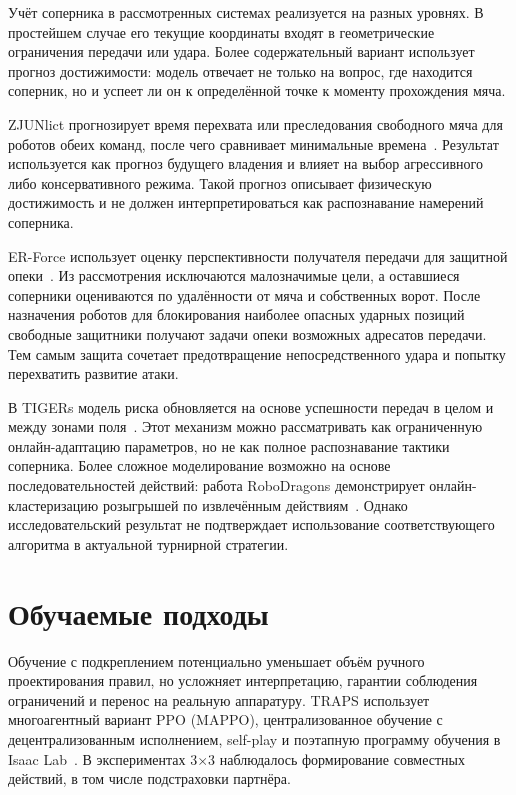 \documentclass{misisarticle}
\begin{document}
Учёт соперника в рассмотренных системах реализуется на разных уровнях. В простейшем случае его текущие координаты входят в геометрические ограничения передачи или удара. Более содержательный вариант использует прогноз достижимости: модель отвечает не только на вопрос, где находится соперник, но и успеет ли он к определённой точке к моменту прохождения мяча.

ZJUNlict прогнозирует время перехвата или преследования свободного мяча для роботов обеих команд, после чего сравнивает минимальные времена~\cite{zjunlict2025}. Результат используется как прогноз будущего владения и влияет на выбор агрессивного либо консервативного режима. Такой прогноз описывает физическую достижимость и не должен интерпретироваться как распознавание намерений соперника.

ER-Force использует оценку перспективности получателя передачи для защитной опеки~\cite{erforce2019}. Из рассмотрения исключаются малозначимые цели, а оставшиеся соперники оцениваются по удалённости от мяча и собственных ворот. После назначения роботов для блокирования наиболее опасных ударных позиций свободные защитники получают задачи опеки возможных адресатов передачи. Тем самым защита сочетает предотвращение непосредственного удара и попытку перехватить развитие атаки.

В TIGERs модель риска обновляется на основе успешности передач в целом и между зонами поля~\cite{tigers2025}. Этот механизм можно рассматривать как ограниченную онлайн-адаптацию параметров, но не как полное распознавание тактики соперника. Более сложное моделирование возможно на основе последовательностей действий: работа RoboDragons демонстрирует онлайн-кластеризацию розыгрышей по извлечённым действиям~\cite{robodragons2019}. Однако исследовательский результат не подтверждает использование соответствующего алгоритма в актуальной турнирной стратегии.

\section{Обучаемые подходы}

Обучение с подкреплением потенциально уменьшает объём ручного проектирования правил, но усложняет интерпретацию, гарантии соблюдения ограничений и перенос на реальную аппаратуру. TRAPS использует многоагентный вариант PPO (MAPPO), централизованное обучение с децентрализованным исполнением, self-play и поэтапную программу обучения в Isaac Lab~\cite{traps2026}. В экспериментах 3$\times$3 наблюдалось формирование совместных действий, в том числе подстраховки партнёра.
\end{document}
